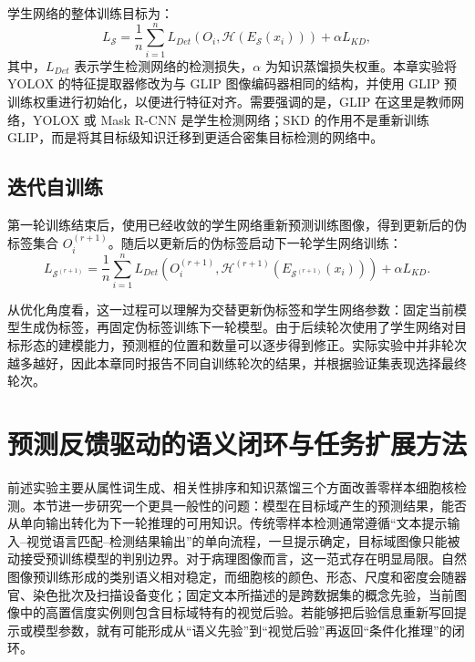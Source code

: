 学生网络的整体训练目标为：
\begin{equation}
\label{eq:attrip_student}
L_{\mathcal S}=\frac{1}{n}\sum_{i=1}^{n}
L_{Det}\left(O_i,\mathcal H(E_{\mathcal S}(x_i))\right)
+\alpha L_{KD},
\end{equation}
其中，$L_{Det}$ 表示学生检测网络的检测损失，$\alpha$ 为知识蒸馏损失权重。本章实验将 YOLOX 的特征提取器修改为与 GLIP 图像编码器相同的结构，并使用 GLIP 预训练权重进行初始化，以便进行特征对齐。需要强调的是，GLIP 在这里是教师网络，YOLOX 或 Mask R-CNN 是学生检测网络；SKD 的作用不是重新训练 GLIP，而是将其目标级知识迁移到更适合密集目标检测的网络中。

\subsection{迭代自训练}

第一轮训练结束后，使用已经收敛的学生网络重新预测训练图像，得到更新后的伪标签集合 $O_i^{(r+1)}$。随后以更新后的伪标签启动下一轮学生网络训练：
\begin{equation}
\label{eq:attrip_iterative}
L_{\mathcal S^{(r+1)}}=\frac{1}{n}\sum_{i=1}^{n}
L_{Det}\left(O_i^{(r+1)},
\mathcal H^{(r+1)}(E_{\mathcal S^{(r+1)}}(x_i))\right)
+\alpha L_{KD}.
\end{equation}

从优化角度看，这一过程可以理解为交替更新伪标签和学生网络参数：固定当前模型生成伪标签，再固定伪标签训练下一轮模型。由于后续轮次使用了学生网络对目标形态的建模能力，预测框的位置和数量可以逐步得到修正。实际实验中并非轮次越多越好，因此本章同时报告不同自训练轮次的结果，并根据验证集表现选择最终轮次。

\section{预测反馈驱动的语义闭环与任务扩展方法}

前述实验主要从属性词生成、相关性排序和知识蒸馏三个方面改善零样本细胞核检测。本节进一步研究一个更具一般性的问题：模型在目标域产生的预测结果，能否从单向输出转化为下一轮推理的可用知识。传统零样本检测通常遵循“文本提示输入--视觉语言匹配--检测结果输出”的单向流程，一旦提示确定，目标域图像只能被动接受预训练模型的判别边界。对于病理图像而言，这一范式存在明显局限。自然图像预训练形成的类别语义相对稳定，而细胞核的颜色、形态、尺度和密度会随器官、染色批次及扫描设备变化；固定文本所描述的是跨数据集的概念先验，当前图像中的高置信度实例则包含目标域特有的视觉后验。若能够把后验信息重新写回提示或模型参数，就有可能形成从“语义先验”到“视觉后验”再返回“条件化推理”的闭环。

